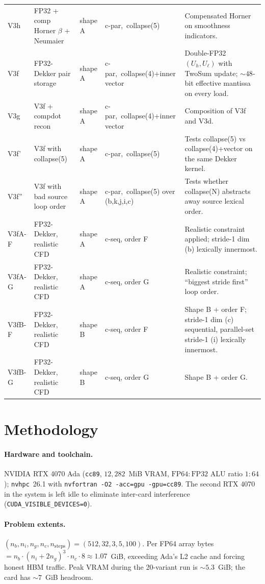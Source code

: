 \documentclass[11pt,a4paper]{article}
\begin{document}
{\begin{longtable}{@{}p{1.0cm}p{2.2cm}p{2.5cm}p{2.4cm}p{6.5cm}@{}}
V3h    & FP32 + comp Horner \(\beta\) + Neumaier & shape A & c-par,~collapse(5) & Compensated Horner on smoothness indicators. \\
V3f    & FP32-Dekker pair storage & shape A & c-par,~collapse(4)+inner vector & Double-FP32 \((U_h, U_\ell)\) with TwoSum update; \(\sim\!48\)-bit effective mantissa on every load. \\
V3g    & V3f + compdot recon & shape A & c-par,~collapse(4)+inner vector & Composition of V3f and V3d. \\
V3f'   & V3f with collapse(5) & shape A & c-par,~collapse(5)  & Tests collapse(5) vs collapse(4)+vector on the same Dekker kernel. \\
V3f''  & V3f with bad source loop order & shape A & c-par,~collapse(5) over (b,k,j,i,c) & Tests whether collapse(N) abstracts away source lexical order. \\
V3fA-F & FP32-Dekker, realistic CFD & shape A & c-seq, order F & Realistic constraint applied; stride-1 dim (b) lexically innermost. \\
V3fA-G & FP32-Dekker, realistic CFD & shape A & c-seq, order G & Realistic constraint; ``biggest stride first'' loop order. \\
V3fB-F & FP32-Dekker, realistic CFD & shape B & c-seq, order F & Shape B + order F; stride-1 dim (c) sequential, parallel-set stride-1 (i) lexically innermost. \\
V3fB-G & FP32-Dekker, realistic CFD & shape B & c-seq, order G & Shape B + order G. \\
\bottomrule
\end{longtable}
}

\section{Methodology}
\label{sec:method}

\paragraph{Hardware and toolchain.} NVIDIA RTX 4070 Ada
(\texttt{cc89}, \(12{,}282\)~MiB VRAM, \(\mathrm{FP64{:}FP32}\) ALU
ratio \(1{:}64\)); \texttt{nvhpc}~26.1 with \texttt{nvfortran -O2
-acc=gpu -gpu=cc89}. The second RTX 4070 in the system is left idle
to eliminate inter-card interference (\texttt{CUDA\_VISIBLE\_DEVICES=0}).

\paragraph{Problem extents.}
\((n_b, n_i, n_g, n_c, n_{\mathrm{steps}}) = (512, 32, 3, 5, 100)\).
Per FP64 array bytes \(= n_b\cdot(n_i+2n_g)^3\cdot n_c\cdot 8 \approx 1.07\)~GiB,
exceeding Ada's L2 cache and forcing honest HBM traffic. Peak VRAM
during the 20-variant run is \(\sim 5.3\)~GiB; the card has \(\sim
7\)~GiB headroom.
\end{document}

